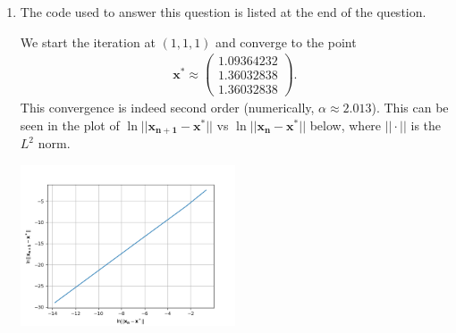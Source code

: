 \documentclass[10pt]{article}
\renewcommand{\vec}{\mathbf}
\begin{document}
\begin{enumerate}
    \item The code used to answer this question is listed at the end of the question.
    
    We start the iteration at \((1,1,1)\) and converge to the point \begin{align*}
        \vec{x^*} \approx \begin{pmatrix}
          1.09364232 \\ 1.36032838 \\ 1.36032838
        \end{pmatrix}.
    \end{align*} This convergence is indeed second order (numerically, \(\alpha \approx 2.013\)). This can be seen in the plot of \(\ln || \mathbf{x_{n+1}} - \mathbf{x^*} ||\) vs \(\ln || \mathbf{x_{n}} - \mathbf{x^*} ||\) below, where \(|| \cdot  ||\) is the \(L^2\) norm.

    \begin{center}
      \includegraphics[width=0.5\textwidth]{hw5_3b.png}
    \end{center}

    {\small }
\end{enumerate}
\end{document}
